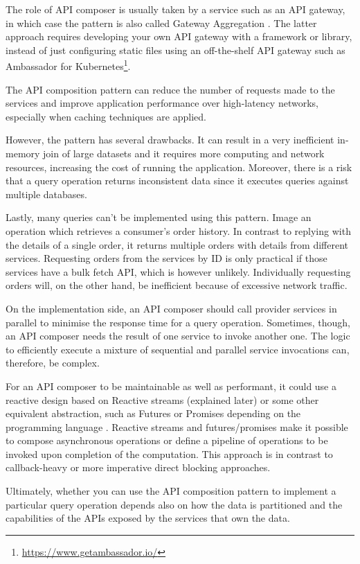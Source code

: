 \documentclass[conference]{IEEEtran}
\begin{document}
The role of API composer is usually taken by a service such as an API gateway, in which case the pattern is also called Gateway Aggregation \cite{gateway-aggregation}. The latter approach requires developing your own API gateway with a framework or library, instead of just configuring static files using an off-the-shelf API gateway such as Ambassador for Kubernetes\footnote{\url{https://www.getambassador.io/}}. 

The API composition pattern can reduce the number of requests made to the services and improve application performance over high-latency networks, especially when caching techniques are applied.

However, the pattern has several drawbacks. It can result in a very inefficient in-memory join of large datasets and it requires more computing and network resources, increasing the cost of running the application. Moreover, there is a risk that a query operation returns inconsistent data since it executes queries against multiple databases.

Lastly, many queries can't be implemented using this pattern. Image an operation which retrieves a consumer's order history. In contrast to replying with the details of a single order, it returns multiple orders with details from different services. Requesting orders from the services by ID is only practical if those services have a bulk fetch API, which is however unlikely. Individually requesting orders will, on the other hand, be inefficient because of excessive network traffic.

On the implementation side, an API composer should call provider services in parallel to minimise the response time for a query operation. Sometimes, though, an API composer needs the result of one service to invoke another one. The logic to efficiently execute a mixture of sequential and parallel service invocations can, therefore, be complex.

For an API composer to be maintainable as well as performant, it could use a reactive design based on Reactive streams (explained later) or some other equivalent abstraction, such as Futures or Promises depending on the programming language \cite{futures-and-promises}. Reactive streams and futures/promises make it possible to compose asynchronous operations or define a pipeline of operations to be invoked upon completion of the computation. This approach is in contrast to callback-heavy or more imperative direct blocking approaches.

Ultimately, whether you can use the API composition pattern to implement a particular query operation depends also on how the data is partitioned and the capabilities of the APIs exposed by the services that own the data. 
\end{document}
